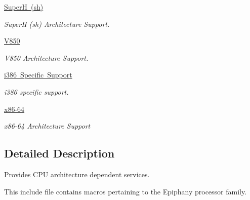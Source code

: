 \begin{DoxyCompactItemize}
\mbox{\hyperlink{group__RTEMSScoreCPUsh}{Super\+H (sh)}}
\begin{DoxyCompactList}\small\item\em SuperH (sh) Architecture Support. \end{DoxyCompactList}\item 
\mbox{\hyperlink{group__RTEMSScoreCPUV850}{V850}}
\begin{DoxyCompactList}\small\item\em V850 Architecture Support. \end{DoxyCompactList}\item 
\mbox{\hyperlink{group__RTEMSScoreCPUi386}{i386 Specific Support}}
\begin{DoxyCompactList}\small\item\em i386 specific support. \end{DoxyCompactList}\item 
\mbox{\hyperlink{group__RTEMSScoreCPUx86-64}{x86-\/64}}
\begin{DoxyCompactList}\small\item\em x86-\/64 Architecture Support \end{DoxyCompactList}\end{DoxyCompactItemize}


\subsection{Detailed Description}
Provides C\+PU architecture dependent services. 

This include file contains macros pertaining to the Epiphany processor family.